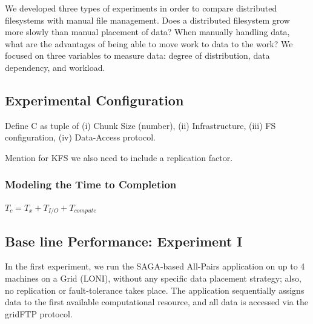 \documentclass{rspublic}
\begin{document}
We developed three types of experiments in order to compare
distributed filesystems with manual file management.  Does a
distributed filesystem grow more slowly than manual placement of data?
When manually handling data, what are the advantages of being able to
move work to data to the work?  We focused on three variables to
measure data: degree of distribution, data dependency, and workload.

\subsection{Experimental Configuration}

Define C as  tuple of (i) Chunk Size (number), (ii) Infrastructure,
(iii) FS configuration, (iv) Data-Access protocol.

Mention for KFS we also need to include a replication factor.

\subsubsection{Modeling the Time to Completion}

$T_c = T_x + T_{I/O} + T_{compute}$

\subsection{Base line Performance: Experiment I} In the first experiment, we run the
SAGA-based All-Pairs application on up to 4 machines on a Grid (LONI),
without any specific data placement strategy; also, no replication or
fault-tolerance takes place.  The application sequentially assigns
data to the first available computational resource, and all data is
accessed via the gridFTP protocol.
\end{document}
